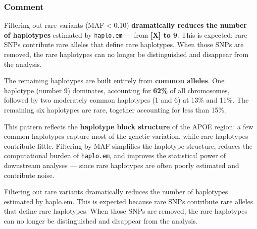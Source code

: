 \documentclass[
]{article}
\begin{document}
\subsubsection{Comment}\label{comment}

Filtering out rare variants (MAF \textless{} 0.10) \textbf{dramatically
reduces the number of haplotypes} estimated by \texttt{haplo.em} ---
from \textbf{{[}X{]} to 9}. This is expected: rare SNPs contribute rare
alleles that define rare haplotypes. When those SNPs are removed, the
rare haplotypes can no longer be distinguished and disappear from the
analysis.

The remaining haplotypes are built entirely from \textbf{common
alleles}. One haplotype (number 9) dominates, accounting for
\textbf{62\%} of all chromosomes, followed by two moderately common
haplotypes (1 and 6) at 13\% and 11\%. The remaining six haplotypes are
rare, together accounting for less than 15\%.

This pattern reflects the \textbf{haplotype block structure} of the APOE
region: a few common haplotypes capture most of the genetic variation,
while rare haplotypes contribute little. Filtering by MAF simplifies the
haplotype structure, reduces the computational burden of
\texttt{haplo.em}, and improves the statistical power of downstream
analyses --- since rare haplotypes are often poorly estimated and
contribute noise.

Filtering out rare variants dramatically reduces the number of
haplotypes estimated by haplo.em. This is expected because rare SNPs
contribute rare alleles that define rare haplotypes. When those SNPs are
removed, the rare haplotypes can no longer be distinguished and
disappear from the analysis.
\end{document}
